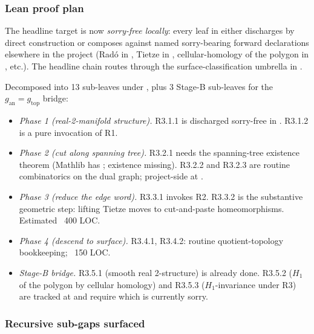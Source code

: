 \subsubsection*{Lean proof plan}

The headline target
is now \emph{sorry-free locally}: every leaf in
 either
discharges by direct construction or composes against named
sorry-bearing forward declarations elsewhere in the project (Rad\'o in
, Tietze in
, cellular-homology of the polygon
in , etc.).  The headline
chain routes through the surface-classification umbrella in
.

Decomposed into 13 sub-leaves under
, plus 3 Stage-B
sub-leaves for the \(g_{\mathrm{an}} = g_{\mathrm{top}}\) bridge:

\begin{itemize}
\item \emph{Phase 1 (real-2-manifold structure).}  R3.1.1 is
  discharged sorry-free in
  .  R3.1.2 is
  a pure invocation of R1.
\item \emph{Phase 2 (cut along spanning tree).}  R3.2.1 needs the
  spanning-tree existence theorem (Mathlib has
  ; existence missing).  R3.2.2 and R3.2.3
  are routine combinatorics on the dual graph; project-side at
  .
\item \emph{Phase 3 (reduce the edge word).}  R3.3.1 invokes R2.
  R3.3.2 is the substantive geometric step: lifting Tietze moves to
  cut-and-paste homeomorphisms.  Estimated ~400 LOC.
\item \emph{Phase 4 (descend to surface).}  R3.4.1, R3.4.2: routine
  quotient-topology bookkeeping; ~150 LOC.
\item \emph{Stage-B bridge.}  R3.5.1 (smooth real 2-structure) is
  already done.  R3.5.2 (\(H_1\) of the polygon by cellular
  homology) and R3.5.3 (\(H_1\)-invariance under R3) are tracked at
  and require  which is currently sorry.
\end{itemize}

\subsubsection*{Recursive sub-gaps surfaced}

